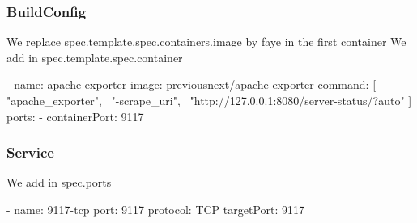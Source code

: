 \documentclass{beamer}
\begin{document}
\begin{frame}[fragile]
  \frametitle{BuildConfig}
  We replace spec.template.spec.containers.image by faye in the first container
  We add in spec.template.spec.container
  \begin{yamlcode}
    - name: apache-exporter
    image: previousnext/apache-exporter
    command: [ "apache_exporter", \
    "-scrape_uri", \
    "http://127.0.0.1:8080/server-status/?auto" ]
    ports:
    - containerPort: 9117
  \end{yamlcode}
\end{frame}

\begin{frame}[fragile]
  \frametitle{Service}
  We add in spec.ports
  \begin{yamlcode}
    - name: 9117-tcp
    port: 9117
    protocol: TCP
    targetPort: 9117
  \end{yamlcode}
\end{frame}
\end{document}

